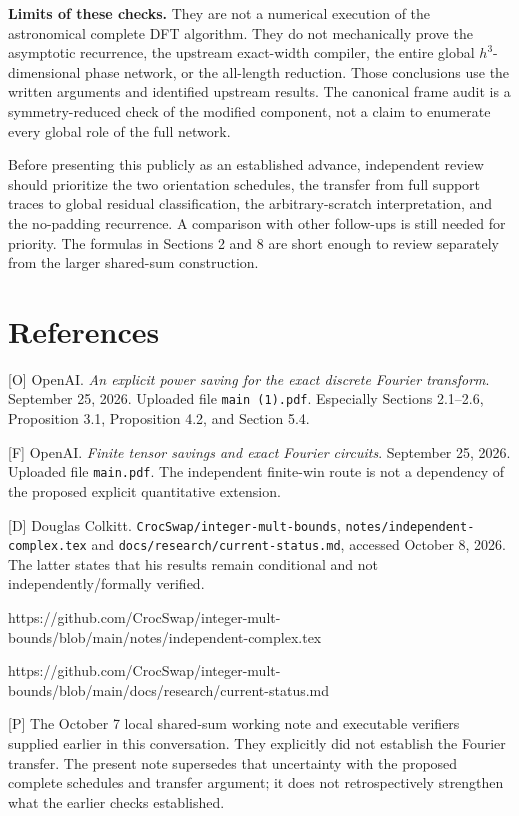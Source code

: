 \documentclass[
  11pt,
  letterpaper,
]{article}
\begin{document}
\textbf{Limits of these checks.} They are not a numerical execution of
the astronomical complete DFT algorithm. They do not mechanically prove
the asymptotic recurrence, the upstream exact-width compiler, the entire
global \(h^3\)-dimensional phase network, or the all-length reduction.
Those conclusions use the written arguments and identified upstream
results. The canonical frame audit is a symmetry-reduced check of the
modified component, not a claim to enumerate every global role of the
full network.

Before presenting this publicly as an established advance, independent
review should prioritize the two orientation schedules, the transfer
from full support traces to global residual classification, the
arbitrary-scratch interpretation, and the no-padding recurrence. A
comparison with other follow-ups is still needed for priority. The
formulas in Sections 2 and 8 are short enough to review separately from
the larger shared-sum construction.

\section{References}\label{references}

{[}O{]} OpenAI. \emph{An explicit power saving for the exact discrete
Fourier transform}. September 25, 2026. Uploaded file
\texttt{main\ (1).pdf}. Especially Sections 2.1--2.6, Proposition 3.1,
Proposition 4.2, and Section 5.4.

{[}F{]} OpenAI. \emph{Finite tensor savings and exact Fourier circuits}.
September 25, 2026. Uploaded file \texttt{main.pdf}. The independent
finite-win route is not a dependency of the proposed explicit
quantitative extension.

{[}D{]} Douglas Colkitt. \texttt{CrocSwap/integer-mult-bounds},
\texttt{notes/independent-complex.tex} and
\texttt{docs/research/current-status.md}, accessed October 8, 2026. The
latter states that his results remain conditional and not
independently/formally verified.

https://github.com/CrocSwap/integer-mult-bounds/blob/main/notes/independent-complex.tex

https://github.com/CrocSwap/integer-mult-bounds/blob/main/docs/research/current-status.md

{[}P{]} The October 7 local shared-sum working note and executable
verifiers supplied earlier in this conversation. They explicitly did not
establish the Fourier transfer. The present note supersedes that
uncertainty with the proposed complete schedules and transfer argument;
it does not retrospectively strengthen what the earlier checks
established.
\end{document}
